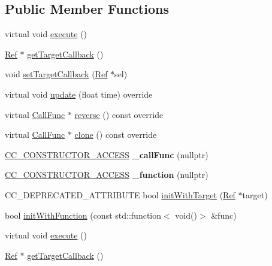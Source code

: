 \subsection*{Public Member Functions}
\begin{DoxyCompactItemize}
\item 
virtual void \hyperlink{classCallFunc_a9a66dcb09103983ddab2ee2c89ae5c0e}{execute} ()
\item 
\hyperlink{classRef}{Ref} $\ast$ \hyperlink{classCallFunc_ae8c6ccb29a5eeb3ef076f7263628dea7}{get\+Target\+Callback} ()
\item 
void \hyperlink{classCallFunc_af44a55cfb845edb38e1c7963e2a6646f}{set\+Target\+Callback} (\hyperlink{classRef}{Ref} $\ast$sel)
\item 
virtual void \hyperlink{classCallFunc_a935c2f87c96d2a5b9e78b1ca875e9d7a}{update} (float time) override
\item 
virtual \hyperlink{classCallFunc}{Call\+Func} $\ast$ \hyperlink{classCallFunc_a5c39f0a5cc14916897280a4a37cc7125}{reverse} () const override
\item 
virtual \hyperlink{classCallFunc}{Call\+Func} $\ast$ \hyperlink{classCallFunc_a87c2d0fecf4d8ae9d4b58a28e594daf0}{clone} () const override
\item 
\mbox{\label{classCallFunc_a31c739695ae40a970ae5886376855e0e}} 
\hyperlink{_2cocos2d_2cocos_2base_2ccConfig_8h_a25ef1314f97c35a2ed3d029b0ead6da0}{C\+C\+\_\+\+C\+O\+N\+S\+T\+R\+U\+C\+T\+O\+R\+\_\+\+A\+C\+C\+E\+SS} {\bfseries \+\_\+call\+Func} (nullptr)
\item 
\mbox{\label{classCallFunc_a4c6a9381c54375506adccee11d0478c4}} 
\hyperlink{_2cocos2d_2cocos_2base_2ccConfig_8h_a25ef1314f97c35a2ed3d029b0ead6da0}{C\+C\+\_\+\+C\+O\+N\+S\+T\+R\+U\+C\+T\+O\+R\+\_\+\+A\+C\+C\+E\+SS} {\bfseries \+\_\+function} (nullptr)
\item 
C\+C\+\_\+\+D\+E\+P\+R\+E\+C\+A\+T\+E\+D\+\_\+\+A\+T\+T\+R\+I\+B\+U\+TE bool \hyperlink{classCallFunc_a68a7834d7931d5439faf49ca6e955dd7}{init\+With\+Target} (\hyperlink{classRef}{Ref} $\ast$target)
\item 
bool \hyperlink{classCallFunc_ab6ad237cb23e996abc60f35ad5091233}{init\+With\+Function} (const std\+::function$<$ void()$>$ \&func)
\item 
virtual void \hyperlink{classCallFunc_acecd67ec8b96193ce6c2d3dfcf1e5f6c}{execute} ()
\item 
\hyperlink{classRef}{Ref} $\ast$ \hyperlink{classCallFunc_ae8c6ccb29a5eeb3ef076f7263628dea7}{get\+Target\+Callback} ()

\end{DoxyCompactItemize}
